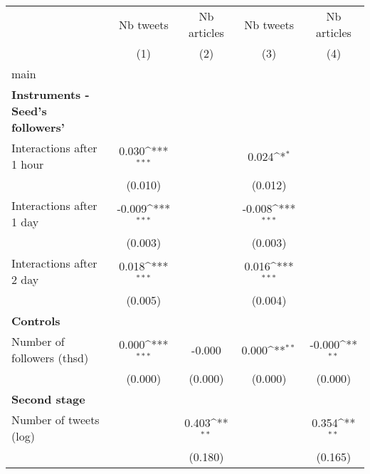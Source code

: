 {
\def\sym#1{\ifmmode^{#1}\else\(^{#1}\)\fi}
\begin{tabular}{l*{4}{c}}
\hline\hline
                    &\multicolumn{1}{c}{Nb tweets}&\multicolumn{1}{c}{Nb articles}&\multicolumn{1}{c}{Nb tweets}&\multicolumn{1}{c}{Nb articles}\\\cmidrule(lr){2-2}\cmidrule(lr){3-3}\cmidrule(lr){4-4}\cmidrule(lr){5-5}
                    &\multicolumn{1}{c}{(1)}         &\multicolumn{1}{c}{(2)}         &\multicolumn{1}{c}{(3)}         &\multicolumn{1}{c}{(4)}         \\
\hline
main                &                     &                     &                     &                     \\
\textbf{Instruments - Seed's followers'}&                     &                     &                     &                     \\
Interactions after 1 hour&       0.030\sym{***}&                     &       0.024\sym{*}  &                     \\
                    &     (0.010)         &                     &     (0.012)         &                     \\
Interactions after 1 day&      -0.009\sym{***}&                     &      -0.008\sym{***}&                     \\
                    &     (0.003)         &                     &     (0.003)         &                     \\
Interactions after 2 day&       0.018\sym{***}&                     &       0.016\sym{***}&                     \\
                    &     (0.005)         &                     &     (0.004)         &                     \\
\textbf{Controls}   &                     &                     &                     &                     \\
Number of followers (thsd)&       0.000\sym{***}&      -0.000         &       0.000\sym{**} &      -0.000\sym{**} \\
                    &     (0.000)         &     (0.000)         &     (0.000)         &     (0.000)         \\
\textbf{Second stage}&                     &                     &                     &                     \\
Number of tweets (log)&                     &       0.403\sym{**} &                     &       0.354\sym{**} \\
                    &                     &     (0.180)         &                     &     (0.165)         \\

\end{tabular}}
